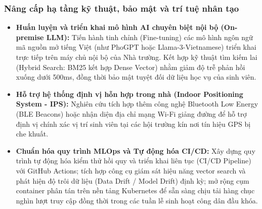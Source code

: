 \subsubsection{Nâng cấp hạ tầng kỹ thuật, bảo mật và trí tuệ nhân tạo}
\begin{itemize}[leftmargin=*]
    \item \textbf{Huấn luyện và triển khai mô hình AI chuyên biệt nội bộ (On-premise LLM):} Tiến hành tinh chỉnh (Fine-tuning) các mô hình ngôn ngữ mã nguồn mở tiếng Việt (như PhoGPT hoặc Llama-3-Vietnamese) triển khai trực tiếp trên máy chủ nội bộ của Nhà trường. Kết hợp kỹ thuật tìm kiếm lai (Hybrid Search: BM25 kết hợp Dense Vector) nhằm giảm độ trễ phản hồi xuống dưới 500ms, đồng thời bảo mật tuyệt đối dữ liệu học vụ của sinh viên.
    
    \item \textbf{Hỗ trợ hệ thống định vị hỗn hợp trong nhà (Indoor Positioning System - IPS):} Nghiên cứu tích hợp thêm công nghệ Bluetooth Low Energy (BLE Beacons) hoặc nhận diện địa chỉ mạng Wi-Fi giảng đường để hỗ trợ định vị chính xác vị trí sinh viên tại các hội trường kín nơi tín hiệu GPS bị che khuất.
    
    \item \textbf{Chuẩn hóa quy trình MLOps và Tự động hóa CI/CD:} Xây dựng quy trình tự động hóa kiểm thử hồi quy và triển khai liên tục (CI/CD Pipeline) với GitHub Actions; tích hợp công cụ giám sát hiệu năng vector search và phát hiện độ trôi dữ liệu (Data Drift / Model Drift) định kỳ; mở rộng cụm container phân tán trên nền tảng Kubernetes để sẵn sàng chịu tải hàng chục nghìn lượt truy cập đồng thời trong các tuần lễ sinh hoạt công dân đầu khóa.
\end{itemize}